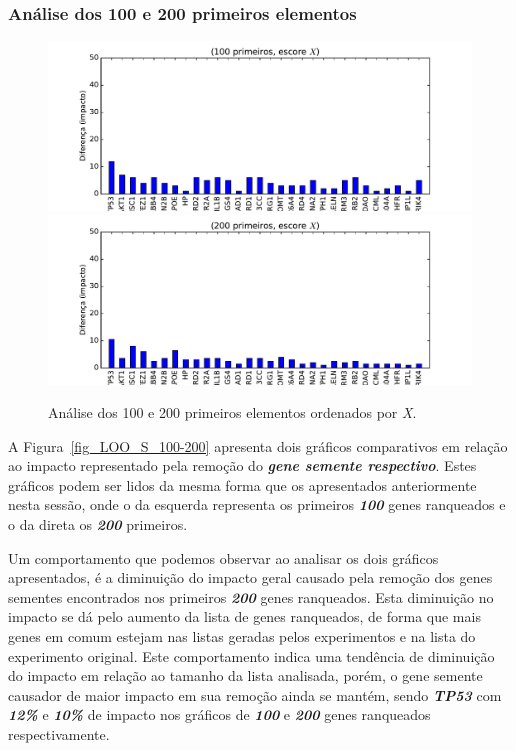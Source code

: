 \subsubsection{Análise dos 100 e 200 primeiros elementos}
%
\begin{figure}[ht!]
\includegraphics[width=1\textwidth]{Images/analyses/fig_LOO_X_100.pdf}
\includegraphics[width=1\textwidth]{Images/analyses/fig_LOO_X_200.pdf}
\caption {Análise dos 100 e 200 primeiros elementos ordenados por \textit{X}.
\label{fig_LOO_X_100-200}}
\end{figure}
%
%

A Figura~\ref{fig_LOO_S_100-200} apresenta dois gráficos comparativos em relação ao impacto representado pela remoção do \textsl{\textbf{gene semente respectivo}}. Estes gráficos podem ser lidos da mesma forma que os apresentados anteriormente nesta sessão, onde o da esquerda representa os primeiros \textsl{\textbf{100}} genes ranqueados e o da direta os \textsl{\textbf{200}} primeiros.
%

Um comportamento que podemos observar ao analisar os dois gráficos apresentados, é a diminuição do impacto geral causado pela remoção dos genes sementes encontrados nos primeiros \textsl{\textbf{200}} genes ranqueados. Esta diminuição no impacto se dá pelo aumento da lista de genes ranqueados, de forma que mais genes em comum estejam nas listas geradas pelos experimentos e na lista do experimento original. Este comportamento indica uma tendência de diminuição do impacto em relação ao tamanho da lista analisada, porém, o gene semente causador de maior impacto em sua remoção ainda se mantém, sendo \textsl{\textbf{TP53}} com \textsl{\textbf{12\%}} e \textsl{\textbf{10\%}} de impacto nos gráficos de \textsl{\textbf{100}} e \textsl{\textbf{200}} genes ranqueados respectivamente.

